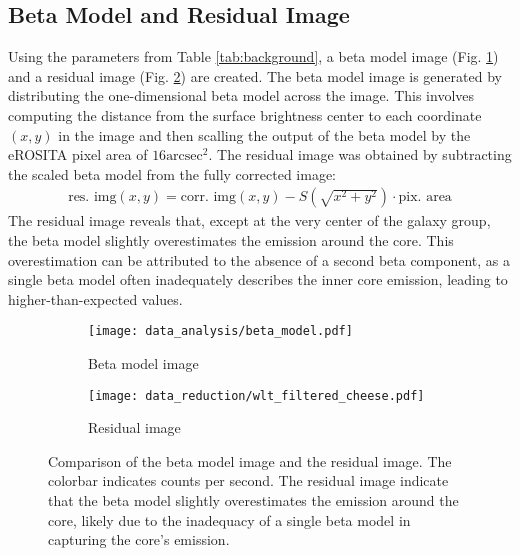 \subsection{Beta Model and Residual Image}
Using the parameters from Table \ref{tab:background}, a beta model image (Fig. \ref{fig:beta_model}) and a residual image (Fig. \ref{fig:residual_image}) are created. The beta model image is generated by distributing the one-dimensional beta model across the image. This involves computing the distance from the surface brightness center to each coordinate \((x, y)\) in the image and then scalling the output of the beta model by the eROSITA pixel area of \(16\text{arcsec}^2\). The residual image was obtained by subtracting the scaled beta model from the fully corrected image:
\begin{align*}
    \text{res. img}(x, y) = \text{corr. img}(x, y) - S(\sqrt{x^2 + y^2}) \cdot \text{pix. area}
\end{align*}
The residual image reveals that, except at the very center of the galaxy group, the beta model slightly overestimates the emission around the core. This overestimation can be attributed to the absence of a second beta component, as a single beta model often inadequately describes the inner core emission, leading to higher-than-expected values.
\begin{figure}[htbp]
    \centering
    \begin{subfigure}[b]{0.48\textwidth}
        \centering
        \texttt{[image: data\_analysis/beta\_model.pdf]}
        \caption{Beta model image}
        \label{fig:beta_model}
    \end{subfigure}
    \hfill
    \begin{subfigure}[b]{0.48\textwidth}
        \centering
        \texttt{[image: data\_reduction/wlt\_filtered\_cheese.pdf]}
        \caption{Residual image}
        \label{fig:residual_image}
    \end{subfigure}
    \caption{Comparison of the beta model image and the residual image. The colorbar indicates counts per second. The residual image indicate that the beta model slightly overestimates the emission around the core, likely due to the inadequacy of a single beta model in capturing the core's emission.}
    \label{fig:comparison_beta_residual}
\end{figure}
